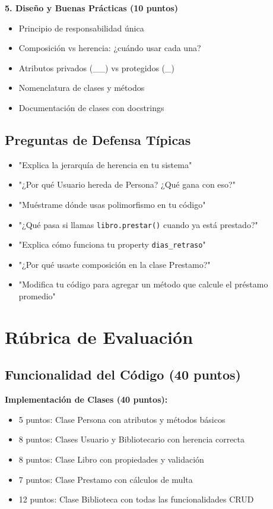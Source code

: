 \documentclass[11pt,letterpaper]{article}
\begin{document}
\textbf{5. Diseño y Buenas Prácticas (10 puntos)}
\begin{itemize}
    \item Principio de responsabilidad única
    \item Composición vs herencia: ¿cuándo usar cada una?
    \item Atributos privados (\_\_) vs protegidos (\_)
    \item Nomenclatura de clases y métodos
    \item Documentación de clases con docstrings
\end{itemize}

\subsection{Preguntas de Defensa Típicas}

\begin{itemize}
    \item "Explica la jerarquía de herencia en tu sistema"
    \item "¿Por qué Usuario hereda de Persona? ¿Qué gana con eso?"
    \item "Muéstrame dónde usas polimorfismo en tu código"
    \item "¿Qué pasa si llamas \texttt{libro.prestar()} cuando ya está prestado?"
    \item "Explica cómo funciona tu property \texttt{dias\_retraso}"
    \item "¿Por qué usaste composición en la clase Prestamo?"
    \item "Modifica tu código para agregar un método que calcule el préstamo promedio"
\end{itemize}

\section{Rúbrica de Evaluación}

\subsection{Funcionalidad del Código (40 puntos)}

\textbf{Implementación de Clases (40 puntos):}
\begin{itemize}
    \item 5 puntos: Clase Persona con atributos y métodos básicos
    \item 8 puntos: Clases Usuario y Bibliotecario con herencia correcta
    \item 8 puntos: Clase Libro con propiedades y validación
    \item 7 puntos: Clase Prestamo con cálculos de multa
    \item 12 puntos: Clase Biblioteca con todas las funcionalidades CRUD
\end{itemize}
\end{document}
